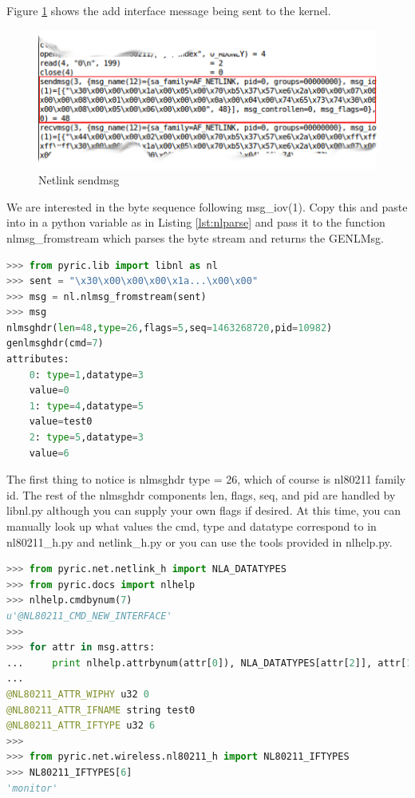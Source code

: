 \documentclass[11pt]{article}
\begin{document}
Figure \ref{fig:nlsend} shows the add interface message being sent to the kernel.
\begin{center}
\begin{figure}[h]
\includegraphics{nlsend}
\caption{Netlink sendmsg}
\label{fig:nlsend}
\end{figure}
\end{center} 
We are interested in the byte sequence following msg\_iov(1). Copy this and paste
into in a python variable as in Listing \ref{lst:nlparse} and pass it to the
function nlmsg\_fromstream which parses the byte stream and returns the GENLMsg.\\

\begin{lstlisting}[caption={Parsing netlink messages},
                   label={lst:nlparse},
                   language=Python]
>>> from pyric.lib import libnl as nl
>>> sent = "\x30\x00\x00\x00\x1a...\x00\x00"
>>> msg = nl.nlmsg_fromstream(sent)
>>> msg
nlmsghdr(len=48,type=26,flags=5,seq=1463268720,pid=10982)
genlmsghdr(cmd=7)
attributes:
	0: type=1,datatype=3
	value=0
	1: type=4,datatype=5
	value=test0
	2: type=5,datatype=3
	value=6
\end{lstlisting}

The first thing to notice is nlmsghdr type = 26, which of course is nl80211 family
id. The rest of the nlmsghdr components len, flags, seq, and pid are handled by
libnl.py although you can supply your own flags if desired. At this time, you can
manually look up what values the cmd, type and datatype correspond to in 
nl80211\_h.py and netlink\_h.py or you can use the tools provided in nlhelp.py.\\

\begin{lstlisting}[caption={Parsing netlink messages continued},
                   label={lst:nlparse2},
                   language=Python]
>>> from pyric.net.netlink_h import NLA_DATATYPES
>>> from pyric.docs import nlhelp
>>> nlhelp.cmdbynum(7)
u'@NL80211_CMD_NEW_INTERFACE'
>>>
>>> for attr in msg.attrs:
...     print nlhelp.attrbynum(attr[0]), NLA_DATATYPES[attr[2]], attr[1]
... 
@NL80211_ATTR_WIPHY u32 0
@NL80211_ATTR_IFNAME string test0
@NL80211_ATTR_IFTYPE u32 6
>>>
>>> from pyric.net.wireless.nl80211_h import NL80211_IFTYPES
>>> NL80211_IFTYPES[6]
'monitor'
\end{lstlisting}
\end{document}
